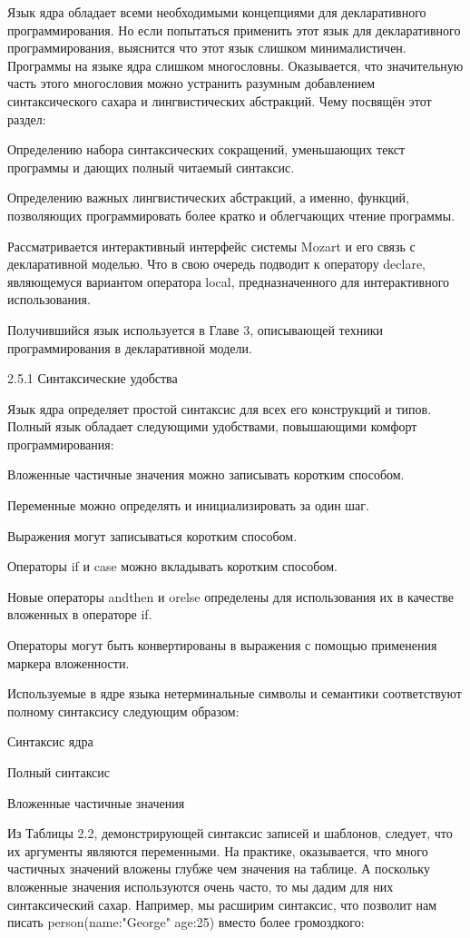 Язык ядра обладает всеми необходимыми концепциями для декларативного программирования. Но если попытаться применить этот язык для декларативного программирования, выяснится что этот язык слишком минималистичен. Программы на языке ядра слишком многословны. Оказывается, что значительную часть этого многословия можно устранить разумным добавлением синтаксического сахара и лингвистических абстракций. Чему посвящён этот раздел:

Определению набора синтаксических сокращений, уменьшающих текст программы и дающих полный читаемый синтаксис.

Определению важных лингвистических абстракций, а именно, функций, позволяющих программировать более кратко и облегчающих чтение программы.

Рассматривается интерактивный интерфейс системы Mozart и его связь с декларативной моделью. Что в свою очередь подводит к оператору declare, являющемуся вариантом оператора local, предназначенного для интерактивного использования.

Получившийся язык используется в Главе 3, описывающей техники программирования в декларативной модели.

2.5.1 Синтаксические удобства

Язык ядра определяет простой синтаксис для всех его конструкций и типов. Полный язык обладает следующими удобствами, повышающими комфорт программирования:

Вложенные частичные значения можно записывать коротким способом.

Переменные можно определять и инициализировать за один шаг.

Выражения могут записываться коротким способом.

Операторы if и case можно вкладывать коротким способом.

Новые операторы andthen и orelse определены для использования их в качестве вложенных в операторе if.

Операторы могут быть конвертированы в выражения с помощью применения маркера вложенности.

Используемые в ядре языка нетерминальные символы и семантики соответствуют полному синтаксису следующим образом:

Синтаксис ядра

Полный синтаксис

Вложенные частичные значения

Из Таблицы 2.2, демонстрирующей синтаксис записей и шаблонов, следует, что их аргументы являются переменными. На практике, оказывается, что много частичных значений вложены глубже чем значения на таблице. А поскольку вложенные значения используются очень часто, то мы дадим для них синтаксический сахар. Например, мы расширим синтаксис, что позволит нам писать person(name:"George" age:25) вместо более громоздкого:

